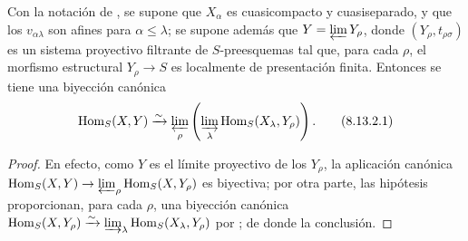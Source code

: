 \begin{corollary}[8.13.2]
\label{IV.8.13.2-fr}
Con la notación de , se supone que $X_\alpha$ es cuasicompacto y cuasiseparado, y que los $v_{\alpha\lambda}$ son afines para $\alpha\leqslant\lambda$; se supone además que $Y=\varprojlim Y_\rho$, donde $(Y_\rho,t_{\rho\sigma})$ es un sistema proyectivo filtrante de $S$-preesquemas tal que, para cada $\rho$, el morfismo estructural $Y_\rho\to S$ es localmente de presentación finita.
Entonces se tiene una biyección canónica
\begin{equation}
\label{IV.8.13.2.1-fr}
\operatorname{Hom}_S(X,Y)
\xrightarrow{\sim}
\varprojlim_\rho\left(\varinjlim_\lambda
\operatorname{Hom}_S(X_\lambda,Y_\rho)\right). \tag{8.13.2.1}
\end{equation}
\end{corollary}

\begin{proof}
En efecto, como $Y$ es el límite proyectivo de los $Y_\rho$, la aplicación canónica $\operatorname{Hom}_S(X,Y)\to
\varprojlim_\rho\operatorname{Hom}_S(X,Y_\rho)$ es biyectiva; por otra parte, las hipótesis proporcionan, para cada $\rho$, una biyección canónica $\operatorname{Hom}_S(X,Y_\rho)\xrightarrow{\sim}
\varinjlim_\lambda\operatorname{Hom}_S(X_\lambda,Y_\rho)$ por ; de donde la conclusión.
\end{proof}

